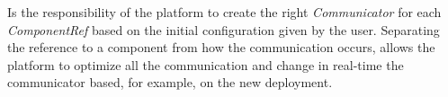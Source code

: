 Is the responsibility of the platform to create the right \emph{Communicator} for each \emph{ComponentRef} based on the initial configuration given
by the user. Separating the reference to a component from how the communication occurs, allows the platform to optimize all the communication and change in real-time the communicator based, for example, on the new deployment.








